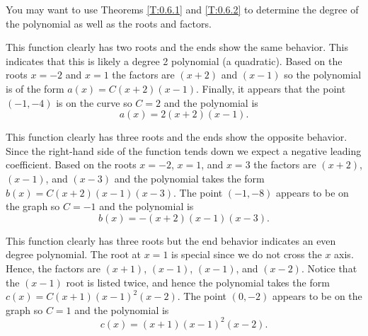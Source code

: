 \begin{bighint}
    You may want to use Theorems \ref{T:0.6.1} and \ref{T:0.6.2} to determine the degree
    of the polynomial as well as the roots and factors.
\end{bighint}
\begin{activitySolution}
   \ba
        \item This function clearly has two roots and the ends show the same behavior.
            This indicates that this is likely a degree 2 polynomial (a quadratic).  Based
            on the roots $x=-2$ and $x=1$ the factors are $(x+2)$ and $(x-1)$ so the
            polynomial is of the form $a(x) = C(x+2)(x-1)$.  Finally, it appears that the
            point $(-1,-4)$ is on the curve so $C=2$ and the polynomial is 
            \[ a(x) = 2(x+2)(x-1). \]
        \item This function clearly has three roots and the ends show the opposite
            behavior.  Since the right-hand side of the function tends down we expect a
            negative leading coefficient.  Based on the roots $x=-2$, $x=1$, and $x=3$ the
            factors are $(x+2)$, $(x-1)$, and $(x-3)$ and the polynomial takes the form
            $b(x) = C(x+2)(x-1)(x-3)$.  The point $(-1,-8)$ appears to be on the graph so
            $C = -1$ and the polynomial is
            \[ b(x) = -(x+2)(x-1)(x-3). \]
        \item This function clearly has three roots but the end behavior indicates an even
            degree polynomial.  The root at $x=1$ is special since we do not cross the $x$
            axis.  Hence, the factors are $(x+1)$, $(x-1)$, $(x-1)$, and $(x-2)$.  Notice
            that the $(x-1)$ root is listed twice, and hence the polynomial takes the form
            $c(x) = C(x+1)(x-1)^2(x-2)$.  The point $(0,-2)$ appears to be on the graph so
            $C = 1$ and the polynomial is
            \[ c(x) = (x+1)(x-1)^2(x-2). \]
   \ea
\end{activitySolution}

\aftera

